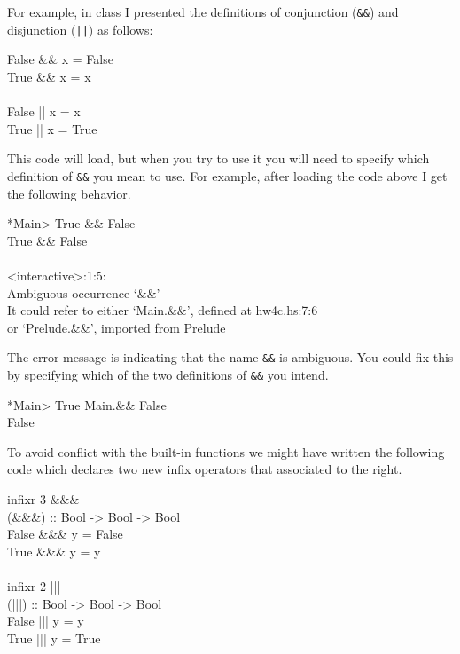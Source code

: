 \documentclass[11pt]{article}
\begin{document}
For example, in class I presented the definitions of conjunction ({\tt{\&\&}})
and disjunction ({\tt{||}}) as follows:

\begin{program*}
\> False \&\&  x = False \\
\> True \&\&  x = x \\
\> \\
\> False || x = x \\
\> True || x = True \\
\end{program*}
This code will load, but when you try to use it you will need to specify which
definition of {\tt{\&\&}} you mean to use.  \newpage{}For example, after loading the code
above I get the following behavior.
\begin{program*}
\> *Main> True \&\& False \\
\> True \&\& False \\
\>  \\
\> <interactive>:1:5: \\
\>     Ambiguous occurrence `\&\&' \\
\>     It could refer to either `Main.\&\&', defined at hw4c.hs:7:6 \\
\>                           or `Prelude.\&\&', imported from Prelude
\end{program*}

The error message is indicating that the name {\tt{\&\&}} is ambiguous. You
could fix this by specifying which of the two definitions of {\tt{\&\&}} you
intend.
\begin{program*}
\> *Main> True Main.\&\& False \\
\> False
\end{program*}

To avoid conflict with the built-in functions we might have written the
following code which declares two new infix operators that associated to the
right.

\begin{program*}
\> infixr 3 \&\&\& \\
\> (\&\&\&) :: Bool -> Bool -> Bool \\
\> False \&\&\& y = False \\
\> True \&\&\& y = y \\
\>  \\
\> infixr 2 ||| \\
\> (|||) :: Bool -> Bool -> Bool \\
\> False ||| y = y \\
\> True ||| y = True
\end{program*}
\end{document}
